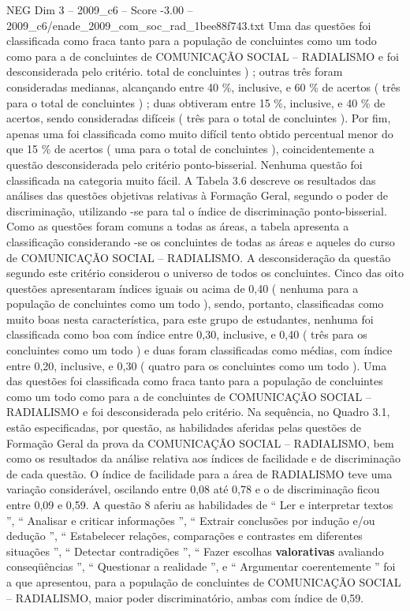 \begin{textsample}{NEG Dim 3 – 2009\_c6 – Score -3.00 – 2009\_c6/enade\_2009\_com\_soc\_rad\_1bee88f743.txt}
Uma das questões foi classificada como fraca tanto para a população de concluintes como um todo como para a de concluintes de COMUNICAÇÃO SOCIAL – RADIALISMO e foi desconsiderada pelo critério. total de concluintes ) ; outras três foram consideradas medianas, alcançando entre 40 \%, inclusive, e 60 \% de acertos ( três para o total de concluintes ) ; duas obtiveram entre 15 \%, inclusive, e 40 \% de acertos, sendo consideradas difíceis ( três para o total de concluintes ).
Por fim, apenas uma foi classificada como muito difícil tento obtido percentual menor do que 15 \% de acertos ( uma para o total de concluintes ), coincidentemente a questão desconsiderada pelo critério ponto-bisserial.
Nenhuma questão foi classificada na categoria muito fácil.
A Tabela 3.6 descreve os resultados das análises das questões objetivas relativas à Formação Geral, segundo o poder de discriminação, utilizando -se para tal o índice de discriminação ponto-bisserial.
Como as questões foram comuns a todas as áreas, a tabela apresenta a classificação considerando -se os concluintes de todas as áreas e aqueles do curso de COMUNICAÇÃO SOCIAL – RADIALISMO.
A desconsideração da questão segundo este critério considerou o universo de todos os concluintes.
Cinco das oito questões apresentaram índices iguais ou acima de 0,40 ( nenhuma para a população de concluintes como um todo ), sendo, portanto, classificadas como muito boas nesta característica, para este grupo de estudantes, nenhuma foi classificada como boa com índice entre 0,30, inclusive, e 0,40 ( três para os concluintes como um todo ) e duas foram classificadas como médias, com índice entre 0,20, inclusive, e 0,30 ( quatro para os concluintes como um todo ).
Uma das questões foi classificada como fraca tanto para a população de concluintes como um todo como para a de concluintes de COMUNICAÇÃO SOCIAL – RADIALISMO e foi desconsiderada pelo critério.
Na sequência, no Quadro 3.1, estão especificadas, por questão, as habilidades aferidas pelas questões de Formação Geral da prova da COMUNICAÇÃO SOCIAL – RADIALISMO, bem como os resultados da análise relativa aos índices de facilidade e de discriminação de cada questão.
O índice de facilidade para a área de RADIALISMO teve uma variação considerável, oscilando entre 0,08 até 0,78 e o de discriminação ficou entre 0,09 e 0,59.
A questão 8 aferiu as habilidades de “ Ler e interpretar textos ”, “ Analisar e criticar informações ”, “ Extrair conclusões por indução e/ou dedução ”, “ Estabelecer relações, comparações e contrastes em diferentes situações ”, “ Detectar contradições ”, “ Fazer escolhas \textbf{valorativas} avaliando conseqüências ”, “ Questionar a realidade ”, e “ Argumentar coerentemente ” foi a que apresentou, para a população de concluintes de COMUNICAÇÃO SOCIAL – RADIALISMO, maior poder discriminatório, ambas com índice de 0,59.

\end{textsample}
